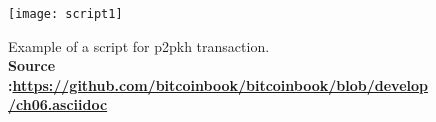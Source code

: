 \begin{figure}[!htbp]
    \centering
    \texttt{[image: script1]}
    \caption[Example of a script for \gls{p2pkh} transaction.]
    {Example of a script for \gls{p2pkh} transaction. \\ \textbf{Source :\url{https://github.com/bitcoinbook/bitcoinbook/blob/develop/ch06.asciidoc}}}
    \label{fig:script1}
\end{figure}
    